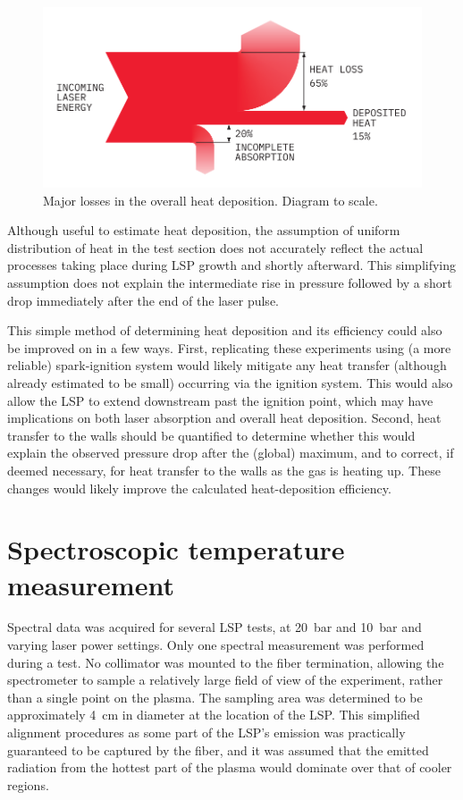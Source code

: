             \begin{figure}[h]
                \centering
                \includegraphics[]{assets/5 results/heatdep_contribs.pdf}
                \caption{Major losses in the overall heat deposition. Diagram to scale.}
                \label{fig:heatdep_sankey}
            \end{figure}

            Although useful to estimate heat deposition, the assumption of uniform distribution of heat in the test section does not accurately reflect the actual processes taking place during LSP growth and shortly afterward. This simplifying assumption does not explain the intermediate rise in pressure followed by a short drop immediately after the end of the laser pulse.

            This simple method of determining heat deposition and its efficiency could also be improved on in a few ways. First, replicating these experiments using (a more reliable) spark-ignition system would likely mitigate any heat transfer (although already estimated to be small) occurring via the ignition system. This would also allow the LSP to extend downstream past the ignition point, which may have implications on both laser absorption and overall heat deposition. Second, heat transfer to the walls should be quantified to determine whether this would explain the observed pressure drop after the (global) maximum, and to correct, if deemed necessary, for heat transfer to the walls as the gas is heating up. These changes would likely improve the calculated heat-deposition efficiency.
    \newpage
    \section{Spectroscopic temperature measurement} \label{sec:results_spectroscopy}
        Spectral data was acquired for several LSP tests, at \qty{20}{bar} and \qty{10}{bar} and varying laser power settings. Only one spectral measurement was performed during a test. No collimator was mounted to the fiber termination, allowing the spectrometer to sample a relatively large field of view of the experiment, rather than a single point on the plasma. The sampling area was determined to be approximately \qty{4}{cm} in diameter at the location of the LSP. This simplified alignment procedures as some part of the LSP's emission was practically guaranteed to be captured by the fiber, and it was assumed that the emitted radiation from the hottest part of the plasma would dominate over that of cooler regions.

